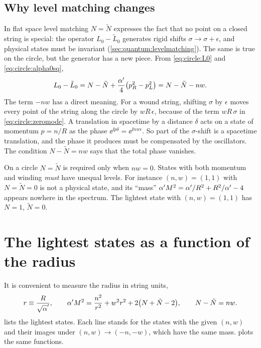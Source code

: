 \subsection{Why level matching changes}\label{sec:circle:whylm}

In flat space level matching $N=\tilde N$ expresses the fact that no point on a closed string
is special: the operator $L_0-\tilde L_0$ generates rigid shifts
$\sigma\to\sigma+\epsilon$, and physical states must be invariant
(\cref{sec:quantum:levelmatching}). The same is true on the circle, but the generator has a new
piece. From \eqref{eq:circle:L0} and \eqref{eq:circle:alpha0sq},
\begin{equation}\label{eq:circle:rotation}
 L_0-\tilde L_0=N-\tilde N+\frac{\alpha'}4\big(p_R^2-p_L^2\big)=N-\tilde N-nw .
\end{equation}
The term $-nw$ has a direct meaning. For a wound string, shifting $\sigma$ by $\epsilon$ moves
every point of the string along the circle by $wR\,\epsilon$, because of the term
$wR\,\sigma$ in \eqref{eq:circle:zeromode}. A translation in spacetime by a distance $\delta$
acts on a state of momentum $p=n/R$ as the phase $\ee^{\ii p\delta}=\ee^{\ii nw\epsilon}$. So
part of the $\sigma$-shift is a spacetime translation, and the phase it produces must be
compensated by the oscillators. The condition $N-\tilde N=nw$ says that the total phase
vanishes.

\begin{pitfallbox}[Common pitfall: imposing $N=\tilde N$ on a circle]
On a circle $N=\tilde N$ is required only when $nw=0$. States with both momentum and winding
\emph{must} have unequal levels. For instance $(n,w)=(1,1)$ with $N=\tilde N=0$ is not a
physical state, and its ``mass'' $\alpha' M^2=\alpha'/R^2+R^2/\alpha'-4$ appears nowhere in the spectrum.
The lightest state with $(n,w)=(1,1)$ has $N=1$, $\tilde N=0$.
\end{pitfallbox}

\section{The lightest states as a function of the radius}\label{sec:circle:spectrum}

It is convenient to measure the radius in string units,
\begin{equation}\label{eq:circle:r}
 r\equiv\frac{R}{\sqrt\ap},\qquad
 \ap M^2=\frac{n^2}{r^2}+w^2r^2+2\big(N+\tilde N-2\big),\qquad N-\tilde N=nw .
\end{equation}
 lists the lightest states. Each line stands for the states with the
given $(n,w)$ and their images under $(n,w)\to(-n,-w)$, which have the same mass.
 plots the same functions.

